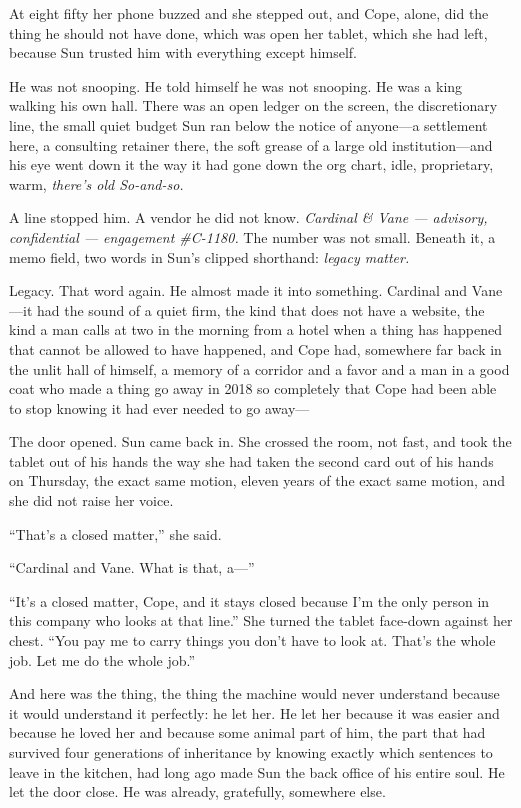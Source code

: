 \documentclass[11pt,openany]{book}
\newcommand{\scenebreak}{\par\vspace{0.5\baselineskip}\begin{center}\textasteriskcentered\quad\textasteriskcentered\quad\textasteriskcentered\end{center}\vspace{0.5\baselineskip}\par}
\begin{document}
\scenebreak


At eight fifty her phone buzzed and she stepped out, and Cope, alone, did the thing he should not have done, which was open her tablet, which she had left, because Sun trusted him with everything except himself.

He was not snooping. He told himself he was not snooping. He was a king walking his own hall. There was an open ledger on the screen, the discretionary line, the small quiet budget Sun ran below the notice of anyone---a settlement here, a consulting retainer there, the soft grease of a large old institution---and his eye went down it the way it had gone down the org chart, idle, proprietary, warm, \textit{there's old So-and-so.}

A line stopped him. A vendor he did not know. \textit{Cardinal \& Vane --- advisory, confidential --- engagement \#C-1180.} The number was not small. Beneath it, a memo field, two words in Sun's clipped shorthand: \textit{legacy matter.}

Legacy. That word again. He almost made it into something. Cardinal and Vane---it had the sound of a quiet firm, the kind that does not have a website, the kind a man calls at two in the morning from a hotel when a thing has happened that cannot be allowed to have happened, and Cope had, somewhere far back in the unlit hall of himself, a memory of a corridor and a favor and a man in a good coat who made a thing go away in 2018 so completely that Cope had been able to stop knowing it had ever needed to go away---

The door opened. Sun came back in. She crossed the room, not fast, and took the tablet out of his hands the way she had taken the second card out of his hands on Thursday, the exact same motion, eleven years of the exact same motion, and she did not raise her voice.

``That's a closed matter,'' she said.

``Cardinal and Vane. What is that, a---''

``It's a closed matter, Cope, and it stays closed because I'm the only person in this company who looks at that line.'' She turned the tablet face-down against her chest. ``You pay me to carry things you don't have to look at. That's the whole job. Let me do the whole job.''

And here was the thing, the thing the machine would never understand because it would understand it perfectly: he let her. He let her because it was easier and because he loved her and because some animal part of him, the part that had survived four generations of inheritance by knowing exactly which sentences to leave in the kitchen, had long ago made Sun the back office of his entire soul. He let the door close. He was already, gratefully, somewhere else.
\end{document}
